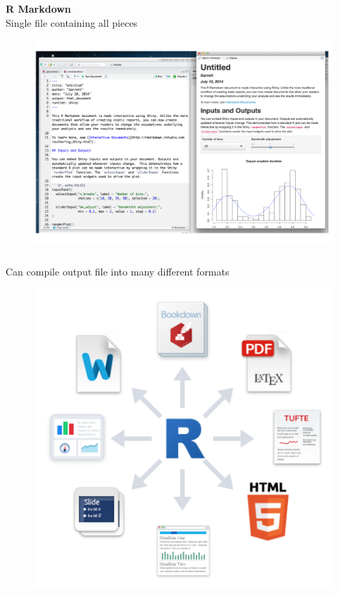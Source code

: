 \documentclass[xcolor=dvipsnames]{beamer}
\begin{document}
\begin{frame}
\frametitle{\insertsectionhead}
\textbf{R Markdown}\\
Single file containing all pieces
\begin{figure}
\includegraphics[scale=0.14]{images/rmd_intro.png}
\end{figure}
\end{frame}

\begin{frame}
\frametitle{\insertsectionhead}
Can compile output file into many different formats
\begin{figure}
\includegraphics[scale=0.75]{images/rmd_formats.png}
\end{figure}
\end{frame}
\end{document}
